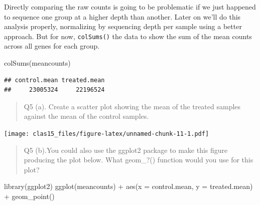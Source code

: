 \documentclass[
]{article}
\newenvironment{Shaded}{\begin{snugshade}}{\end{snugshade}}
\newcommand{\AttributeTok}[1]{\textcolor[rgb]{0.77,0.63,0.00}{#1}}
\newcommand{\FunctionTok}[1]{\textcolor[rgb]{0.00,0.00,0.00}{#1}}
\newcommand{\NormalTok}[1]{#1}
\newcommand{\SpecialCharTok}[1]{\textcolor[rgb]{0.00,0.00,0.00}{#1}}
\newcommand{\StringTok}[1]{\textcolor[rgb]{0.31,0.60,0.02}{#1}}
\begin{document}
Directly comparing the raw counts is going to be problematic if we just
happened to sequence one group at a higher depth than another. Later on
we'll do this analysis properly, normalizing by sequencing depth per
sample using a better approach. But for now, \texttt{colSums()} the data
to show the sum of the mean counts across all genes for each group.

\begin{Shaded}
\begin{Highlighting}[]
\FunctionTok{colSums}\NormalTok{(meancounts)}
\end{Highlighting}
\end{Shaded}

\begin{verbatim}
## control.mean treated.mean 
##     23005324     22196524
\end{verbatim}

\begin{quote}
Q5 (a). Create a scatter plot showing the mean of the treated samples
against the mean of the control samples.
\end{quote}

\begin{Shaded}
\end{Shaded}

\texttt{[image: clas15\_files/figure-latex/unnamed-chunk-11-1.pdf]}

\begin{quote}
Q5 (b).You could also use the ggplot2 package to make this figure
producing the plot below. What geom\_?() function would you use for this
plot?
\end{quote}

\begin{Shaded}
\begin{Highlighting}[]
\FunctionTok{library}\NormalTok{(ggplot2)}
\FunctionTok{ggplot}\NormalTok{(meancounts) }\SpecialCharTok{+} \FunctionTok{aes}\NormalTok{(}\AttributeTok{x =}\NormalTok{ control.mean, }\AttributeTok{y =}\NormalTok{ treated.mean) }\SpecialCharTok{+} 
  \FunctionTok{geom\_point}\NormalTok{()}
\end{Highlighting}
\end{Shaded}
\end{document}
